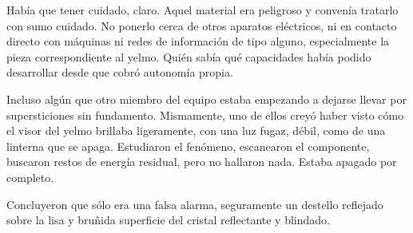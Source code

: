Había que tener cuidado, claro. Aquel material era peligroso y convenía tratarlo con sumo cuidado. No ponerlo cerca de otros aparatos eléctricos, ni en contacto directo con máquinas ni redes de información de tipo alguno, especialmente la pieza correspondiente al yelmo. Quién sabía qué capacidades había podido desarrollar desde que cobró autonomía propia.

Incluso algún que otro miembro del equipo estaba empezando a dejarse llevar por supersticiones sin fundamento. Mismamente, uno de ellos creyó haber visto cómo el visor del yelmo brillaba ligeramente, con una luz fugaz, débil, como de una linterna que se apaga. Estudiaron el fenómeno, escanearon el componente, buscaron restos de energía residual, pero no hallaron nada. Estaba apagado por completo.

Concluyeron que sólo era una falsa alarma, seguramente un destello reflejado sobre la lisa y bruñida superficie del cristal reflectante y blindado.

\endinput
